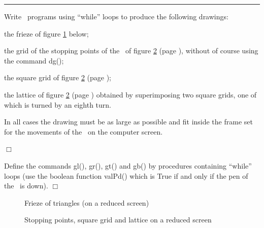 %

\clearpage
{}\noindent \rule{137mm}{0.1mm}\par\nopagebreak %
\begin{exercices}{Write \python\ programs using ``while'' loops to produce the following
drawings:

\tiret  the frieze of figure \ref{fig:FriTri} below;

\tiret  the grid of the stopping points of the \robot\ of figure \ref{fig:DgQuGr} (page \pageref{fig:DgQuGr}),
without of course using the command {\idt dg()};

\tiret  the square grid of figure \ref{fig:DgQuGr} (page \pageref{fig:DgQuGr});

\tiret  the lattice of figure \ref{fig:DgQuGr} (page \pageref{fig:DgQuGr}) obtained by superimposing two
square grids, one of which is turned by an eighth turn.

In all cases the drawing must be as large as possible and fit inside the frame set for the
movements of the \robot\ on the computer screen.

\noindent $\Box$}\end{exercices}

\vspace*{-1ex}%
\begin{exercice}{Define the commands {\idt gl()},  {\idt gr()},  {\idt gt()} and  {\idt gb()} by procedures containing
``while'' loops (use the boolean function {\idt valPd()} which is {\mcl True} if and
only if the pen of the \robot\ is down).
\noindent $\Box$}\end{exercice}

\begin{figure}[htbp]
 \caption{Frieze of triangles (on a reduced screen)}\label{fig:FriTri}
\end{figure}
\begin{figure}[htbp]
 \caption{Stopping points, square grid and lattice on a reduced screen}\label{fig:DgQuGr}
\end{figure}

